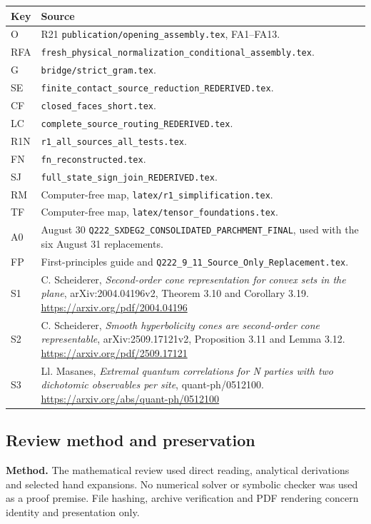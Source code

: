 \begin{longtable}{@{}L{0.10\textwidth}L{0.81\textwidth}@{}}
\toprule Key & Source\\ \midrule\endhead
O & R21 \texttt{publication/opening\_assembly.tex}, FA1--FA13.\\
RFA & \texttt{fresh\_physical\_normalization\_conditional\_assembly.tex}.\\
G & \texttt{bridge/strict\_gram.tex}.\\
SE & \texttt{finite\_contact\_source\_reduction\_REDERIVED.tex}.\\
CF & \texttt{closed\_faces\_short.tex}.\\
LC & \texttt{complete\_source\_routing\_REDERIVED.tex}.\\
R1N & \texttt{r1\_all\_sources\_all\_tests.tex}.\\
FN & \texttt{fn\_reconstructed.tex}.\\
SJ & \texttt{full\_state\_sign\_join\_REDERIVED.tex}.\\
RM & Computer-free map, \texttt{latex/r1\_simplification.tex}.\\
TF & Computer-free map, \texttt{latex/tensor\_foundations.tex}.\\
A0 & August 30 \texttt{Q222\_SXDEG2\_CONSOLIDATED\_PARCHMENT\_FINAL},
used with the six August 31 replacements.\\
FP & First-principles guide and
\texttt{Q222\_9\_11\_Source\_Only\_Replacement.tex}.\\
S1 & C. Scheiderer, \emph{Second-order cone representation for convex
sets in the plane}, arXiv:2004.04196v2, Theorem 3.10 and Corollary 3.19.
\url{https://arxiv.org/pdf/2004.04196}\\
S2 & C. Scheiderer, \emph{Smooth hyperbolicity cones are second-order
cone representable}, arXiv:2509.17121v2, Proposition 3.11 and Lemma 3.12.
\url{https://arxiv.org/pdf/2509.17121}\\
S3 & Ll. Masanes, \emph{Extremal quantum correlations for N parties
with two dichotomic observables per site}, quant-ph/0512100.
\url{https://arxiv.org/abs/quant-ph/0512100}\\
\bottomrule
\end{longtable}

\newpage
\subsection*{Review method and preservation}
\textbf{Method.}
The mathematical review used direct reading, analytical derivations
and selected hand expansions. No numerical solver or symbolic checker
was used as a proof premise. File hashing, archive verification and
PDF rendering concern identity and presentation only.

